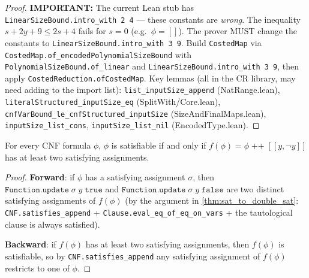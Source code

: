 \begin{proof}
  \textbf{IMPORTANT:} The current Lean stub has
  \texttt{LinearSizeBound.intro\_with 2 4} --- these constants are
  \emph{wrong}. The inequality $s + 2y + 9 \le 2s + 4$ fails for $s = 0$
  (e.g.\ $\phi = []$). The prover MUST change the constants to
  \texttt{LinearSizeBound.intro\_with 3 9}. Build \texttt{CostedMap} via
  \texttt{CostedMap.of\_encodedPolynomialSizeBound} with
  \texttt{PolynomialSizeBound.of\_linear} and
  \texttt{LinearSizeBound.intro\_with 3 9}, then apply
  \texttt{CostedReduction.ofCostedMap}. Key lemmas (all in the CR library,
  may need adding to the import list):
  \texttt{list\_inputSize\_append} (NatRange.lean),
  \texttt{literalStructured\_inputSize\_eq} (SplitWith/Core.lean),
  \texttt{cnfVarBound\_le\_cnfStructured\_inputSize} (SizeAndFinalMaps.lean),
  \texttt{inputSize\_list\_cons}, \texttt{inputSize\_list\_nil}
  (EncodedType.lean).
\end{proof}

\begin{theorem}
  \label{thm:sat_to_double_sat_correct}
 For every CNF formula $\phi$, $\phi$ is satisfiable if and only if
  $f(\phi) = \phi \;\texttt{++}\; [[y, \neg y]]$ has at least two
  satisfying assignments.
\end{theorem}

\begin{proof}
 \textbf{Forward}: if $\phi$ has a satisfying assignment $\sigma$, then
  $\texttt{Function.update}\;\sigma\;y\;\texttt{true}$ and
  $\texttt{Function.update}\;\sigma\;y\;\texttt{false}$ are two distinct
  satisfying assignments of $f(\phi)$ (by the argument in
  \ref{thm:sat_to_double_sat}: \texttt{CNF.satisfies\_append} +
  \texttt{Clause.eval\_eq\_of\_eq\_on\_vars} + the tautological clause is
  always satisfied).

  \textbf{Backward}: if $f(\phi)$ has at least two satisfying assignments,
  then $f(\phi)$ is satisfiable, so by \texttt{CNF.satisfies\_append} any
  satisfying assignment of $f(\phi)$ restricts to one of $\phi$.
\end{proof}
